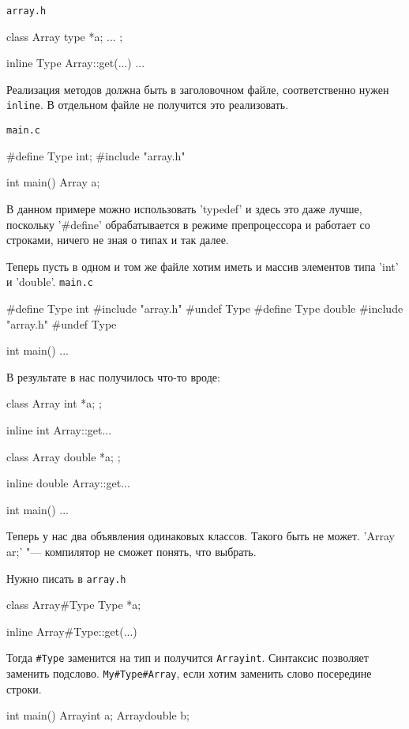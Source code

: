 \verb'array.h'
\begin{cppcode}
class Array {
    type *a;
    ...
};

inline Type Array::get(...) {  
    ...
}
\end{cppcode}

Реализация методов должна быть в заголовочном файле, соответственно нужен \verb'inline'. В отдельном файле не получится это реализовать.

\verb'main.c'
\begin{cppcode}
#define Type int;
#include "array.h"

int main() {
    Array a;
}
\end{cppcode}

В данном примере можно использовать \cpp'typedef' и здесь это даже лучше, поскольку \cpp'#define' обрабатывается в режиме препроцессора
и работает со строками, ничего не зная о типах и так далее.

Теперь пусть в одном и том же файле хотим иметь и массив элементов типа \cpp'int' и \cpp'double'.
\verb'main.c'
\begin{cppcode}
#define Type int
#include "array.h"
#undef Type
#define Type double
#include "array.h"
#undef Type 

int main() {
    ...
}
\end{cppcode}

В результате в нас получилось что-то вроде:
\begin{cppcode}
class Array{
    int *a;
};

inline int Array::get...

class Array{
    double *a;
};

inline double Array::get...

int main() {
    ...
}
\end{cppcode}
Теперь у нас два объявления одинаковых классов.
Такого быть не может.
\cpp'Array ar;' "--- компилятор не сможет понять, что выбрать. 

Нужно писать в \verb'array.h'
\begin{cppcode}
class Array#Type{
    Type *a;
}

inline Array#Type::get(...) {

}
\end{cppcode}

Тогда \verb'#Type' заменится на тип и получится \verb'Arrayint'. Синтаксис позволяет заменить подслово.
\verb'My#Type#Array', если хотим заменить слово посередине строки.

\begin{cppcode}
int main() {
    Arrayint a;
    Arraydouble b;
}
\end{cppcode}

